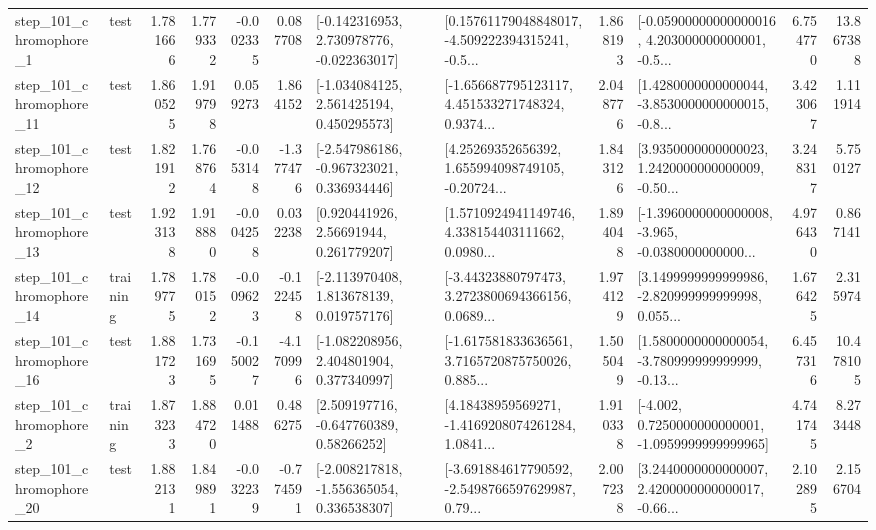 \begin{tabular}{llrrrrllrlrr}
   step\_101\_chromophore\_1 &      test &      1.781666 &    1.779332 &     -0.002335 &  0.087708 &   [-0.142316953, 2.730978776, -0.022363017] &  [0.15761179048848017, -4.509222394315241, -0.5... &       1.868193 &  [-0.05900000000000016, 4.203000000000001, -0.5... &            6.754770 &         13.867388 \\
  step\_101\_chromophore\_11 &      test &      1.860525 &    1.919798 &      0.059273 &  1.864152 &    [-1.034084125, 2.561425194, 0.450295573] &  [-1.656687795123117, 4.451533271748324, 0.9374... &       2.048776 &  [1.4280000000000044, -3.8530000000000015, -0.8... &            3.423067 &          1.111914 \\
  step\_101\_chromophore\_12 &      test &      1.821912 &    1.768764 &     -0.053148 & -1.377476 &   [-2.547986186, -0.967323021, 0.336934446] &  [4.25269352656392, 1.655994098749105, -0.20724... &       1.843126 &  [3.9350000000000023, 1.2420000000000009, -0.50... &            3.248317 &          5.750127 \\
  step\_101\_chromophore\_13 &      test &      1.923138 &    1.918880 &     -0.004258 &  0.032238 &      [0.920441926, 2.56691944, 0.261779207] &  [1.5710924941149746, 4.338154403111662, 0.0980... &       1.894048 &  [-1.3960000000000008, -3.965, -0.0380000000000... &            4.976430 &          0.867141 \\
  step\_101\_chromophore\_14 &  training &      1.789775 &    1.780152 &     -0.009623 & -0.122458 &    [-2.113970408, 1.813678139, 0.019757176] &  [-3.44323880797473, 3.2723800694366156, 0.0689... &       1.974129 &  [3.1499999999999986, -2.820999999999998, 0.055... &            1.676425 &          2.315974 \\
  step\_101\_chromophore\_16 &      test &      1.881723 &    1.731695 &     -0.150027 & -4.170996 &    [-1.082208956, 2.404801904, 0.377340997] &  [-1.617581833636561, 3.7165720875750026, 0.885... &       1.505049 &  [1.5800000000000054, -3.780999999999999, -0.13... &            6.457316 &         10.478105 \\
   step\_101\_chromophore\_2 &  training &      1.873233 &    1.884720 &      0.011488 &  0.486275 &     [2.509197716, -0.647760389, 0.58266252] &  [4.18438959569271, -1.4169208074261284, 1.0841... &       1.910338 &  [-4.002, 0.7250000000000001, -1.0959999999999965] &            4.741745 &          8.273448 \\
  step\_101\_chromophore\_20 &      test &      1.882131 &    1.849891 &     -0.032239 & -0.774591 &   [-2.008217818, -1.556365054, 0.336538307] &  [-3.691884617790592, -2.5498766597629987, 0.79... &       2.007238 &  [3.2440000000000007, 2.4200000000000017, -0.66... &            2.102895 &          2.156704 \\

\end{tabular}
